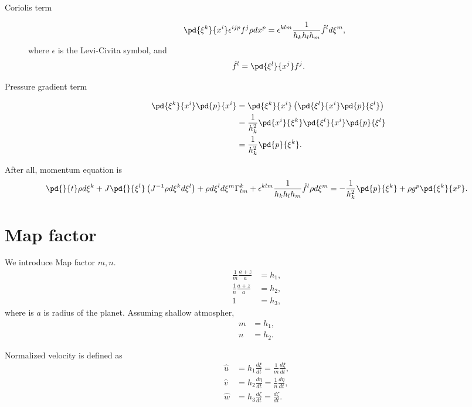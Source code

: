 \documentclass{book}
\begin{document}
\begin{description}
\item[Coriolis term]
\begin{align}
  \pd{\xi^k}{x^i} \epsilon^{ijp} f^j \rho dx^p
  &= \epsilon^{klm} \frac{1}{h_kh_lh_m}\hat{f}^l d\xi^m,
\end{align}
where $\epsilon$ is the Levi-Civita symbol,
and
\begin{equation}
  \hat{f}^l = \pd{\xi^l}{x^j} f^j.
\end{equation}

\item[Pressure gradient term]
\begin{align}
  \pd{\xi^k}{x^i} \pd{p}{x^i}
  &= \pd{\xi^k}{x^i}\left(\pd{\xi^l}{x^i}\pd{p}{\xi^l}\right)\nonumber\\
  &= \frac{1}{h_k^2}\pd{x^i}{\xi^k}\pd{\xi^l}{x^i}\pd{p}{\xi^l} \nonumber\\
  &= \frac{1}{h_k^2}\pd{p}{\xi^k}.
\end{align}

\end{description}

After all, momentum equation is
\begin{align}
  \pd{}{t} \rho d\xi^k + J\pd{}{\xi^l} \left( J^{-1} \rho d\xi^k d\xi^l \right)
  + \rho d\xi^l d\xi^m \Gamma_{lm}^k
  + \epsilon^{klm} \frac{1}{h_kh_lh_m}\hat{f}^l \rho d\xi^m = -\frac{1}{h_k^2}\pd{p}{\xi^k} + \rho g^p \pd{\xi^k}{x^p}.
\end{align}



\section{Map factor}
We introduce Map factor $m, n$.
\begin{align}
  \frac{1}{m}\frac{a+z}{a} &= h_1, \\
  \frac{1}{n}\frac{a+z}{a} &= h_2, \\
  1 &= h_3,
\end{align}
where is $a$ is radius of the planet.
Assuming shallow atmospher,
\begin{align}
  m &= h_1, \\
  n &= h_2.
\end{align}

Normalized velocity is defined as
\begin{align}
  \hat{u} &= h_1\frac{d \xi}{dt} = \frac{1}{m}\frac{d \xi}{dt}, \\
  \hat{v} &= h_2\frac{d \eta}{dt} = \frac{1}{n}\frac{d \eta}{dt}, \\
  \hat{w} &= h_3\frac{d \zeta}{dt} = \frac{d \zeta}{dt}.
\end{align}
\end{document}
